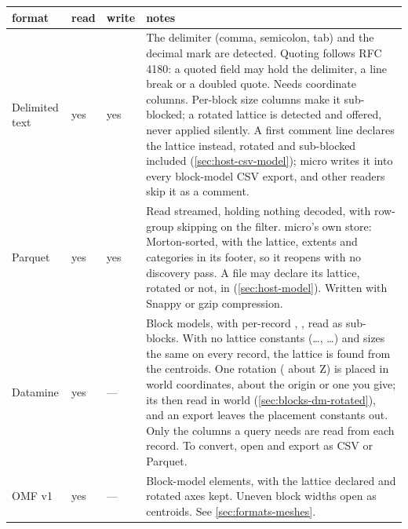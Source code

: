 \begin{tabularx}{\linewidth}{@{}p{27mm}p{9mm}p{9mm}L@{}}
\toprule
format & read & write & notes \\
\midrule
Delimited text     & yes & yes & The delimiter (comma,
  semicolon, tab) and the decimal mark are detected. Quoting follows RFC 4180: a quoted field may
  hold the delimiter, a line break or a doubled quote. Needs coordinate columns. Per-block size
  columns make it sub-blocked; a rotated lattice is detected and offered, never applied silently.
  A first comment line  declares the lattice instead, rotated and
  sub-blocked included (\cref{sec:host-csv-model}); micro writes it into every block-model
  CSV export, and other readers skip it as a comment. \\
Parquet   & yes & yes & Read streamed, holding nothing decoded, with
  row-group skipping on the filter. micro's own store: Morton-sorted, with the lattice, extents and
  categories in its footer, so it reopens with no discovery pass. A file may declare its lattice,
  rotated or not, in  (\cref{sec:host-model}). Written with Snappy or gzip
  compression. \\
Datamine  & yes & — & Block models, with per-record , , 
  read as sub-blocks. With no lattice constants (…, …) and sizes the same on
  every record, the lattice is found from the centroids. One rotation ( about Z) is
  placed in world coordinates, about the origin    or one you give; its
     then read in world (\cref{sec:blocks-dm-rotated}), and an export
  leaves the placement constants out. Only the columns a query needs are read from each record.
  To convert, open and export as CSV or Parquet. \\
OMF v1  & yes & — & Block-model elements, with the lattice declared and rotated axes
  kept. Uneven block widths open as centroids. See \cref{sec:formats-meshes}. \\
\bottomrule
\end{tabularx}

